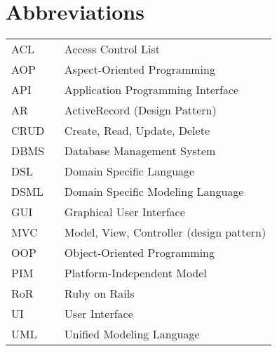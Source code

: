 \chapter*{Abbreviations}

\begin{flushleft}
\begin{tabular}{l p{0.8\linewidth}}
ACL       & Access Control List\\
AOP       & Aspect-Oriented Programming\\
API       & Application Programming Interface\\
AR        & ActiveRecord (Design Pattern)\\
CRUD      & Create, Read, Update, Delete\\
DBMS      & Database Management System\\
DSL       & Domain Specific Language\\
DSML      & Domain Specific Modeling Language\\
GUI       & Graphical User Interface\\
MVC       & Model, View, Controller (design pattern)\\
OOP       & Object-Oriented Programming\\
PIM       & Platform-Independent Model\\
RoR       & Ruby on Rails\\
UI        & User Interface\\
UML       & Unified Modeling Language\\
\end{tabular}
\end{flushleft}


